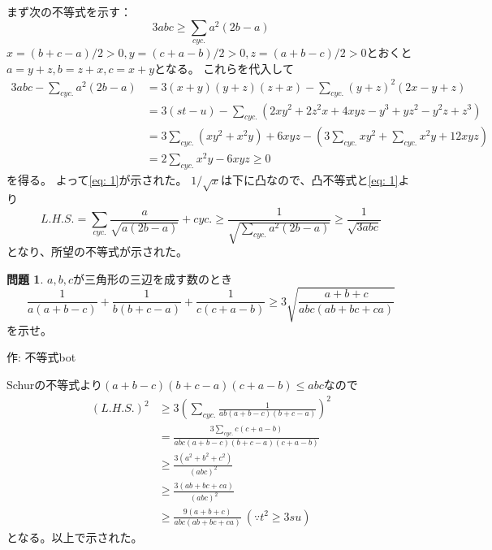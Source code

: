 \documentclass[uplatex, a5paper]{jsarticle}
\makeatletter
\theoremstyle{definition}
\newtheorem{prob}{問題}
\renewenvironment{proof}[1][\proofname]{
  \pushQED{\qed}%
  \normalfont \topsep6\p@\@plus6\p@\relax
  \trivlist
  \item[\hskip\labelsep
    #1\@addpunct{\textbf{.}}]\ignorespaces
}{%
  \popQED\endtrivlist\@endpefalse
}
\providecommand{\proofname}{証明}
\newcommand{\lhs }{ L.H.S. }
\def\qed{\hfill $\Box$}
\makeatother
\begin{document}
\begin{proof}
  まず次の不等式を示す：
  \begin{equation}\label{eq: 1}
    3abc \geq \sum_{cyc.} a^2(2b-a) \tag{\(*\)}
  \end{equation}
  \(x=(b+c-a)/2 > 0 , y=(c+a-b)/2 >0 , z=(a+b-c)/2 >0\)とおくと
  \(a=y+z,b=z+x,c=x+y\)となる。
  これらを代入して
  \begin{align*}
    3abc- \sum_{cyc.} a^2(2b-a) &= 3(x+y)(y+z)(z+x) - \sum_{cyc.} (y+z)^2(2x-y+z) \\
    &= 3(st-u) - \sum_{cyc.}(2xy^2+2z^2x+4xyz-y^3+yz^2-y^2z+z^3) \\
    &= 3\sum_{cyc.}(xy^2+x^2y) + 6xyz - \left( 3\sum_{cyc.}xy^2 + \sum_{cyc.}x^2y +12xyz \right) \\
    &= 2\sum_{cyc.}x^2y -6xyz \geq 0
  \end{align*}
  を得る。
  よって\eqref{eq: 1}が示された。
  \(1/\sqrt{x}\)は下に凸なので、凸不等式と\eqref{eq: 1}より
  \[
  \lhs = \sum_{cyc.} \frac{a}{\sqrt{a(2b-a)}} + cyc.
  \geq \frac{1}{ \sqrt{\sum_{cyc.}a^2(2b-a) }}
  \geq \frac{1}{ \sqrt{3abc}}
  \]
  となり、所望の不等式が示された。
\end{proof}










\newpage

\begin{prob}
  \(a,b,c\)が三角形の三辺を成す数のとき
  \[
  \frac{1}{a(a+b-c)} + \frac{1}{b(b+c-a)} + \frac{1}{c(c+a-b)} \geq 3\sqrt{\frac{a+b+c}{abc(ab+bc+ca)}}
  \]
  を示せ。
  \begin{flushright}
    作: 不等式bot
  \end{flushright}
\end{prob}


\begin{proof}
  Schurの不等式より\((a+b-c)(b+c-a)(c+a-b) \leq abc\)なので
  \begin{align*}
    ( \lhs )^2 &\geq 3\left( \sum_{cyc.} \frac{1}{ab(a+b-c)(b+c-a)} \right) ^2 \\
    &= \frac{3\sum_{cyc.} c(c+a-b) }{abc(a+b-c)(b+c-a)(c+a-b)} \\
    &\geq \frac{3(a^2+b^2+c^2) }{(abc)^2} \\
    &\geq \frac{3(ab+bc+ca)}{(abc)^2} \\
    &\geq \frac{9(a+b+c)}{abc(ab+bc+ca)} \ ( \because t^2 \geq 3su)
  \end{align*}
  となる。以上で示された。
\end{proof}
\end{document}
